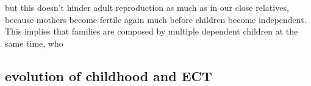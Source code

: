 but this doesn't hinder adult reproduction as much as in our close relatives, because mothers become fertile again much before children become independent. This implies that families are composed by multiple dependent children at the same time, who 



\cite{bird_ethnoarchaeology_2000} 
\cite{bird_children_2002}
\cite{bird_mardu_2005}
\cite{blurton_jones_foraging_1994}

\subsection{evolution of childhood and ECT}
\cite{blurton_jones_why_1997} 
\cite{blurton_jones_selection_2002}


